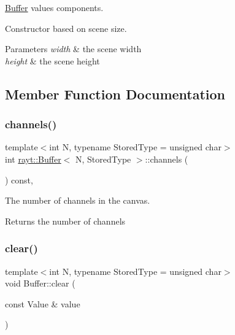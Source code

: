 \mbox{\hyperlink{classrayt_1_1_buffer}{Buffer}} values components. 

Constructor based on scene size.


\begin{DoxyParams}{Parameters}
{\em width} & the scene width \\
\hline
{\em height} & the scene height \\
\hline
\end{DoxyParams}


\subsection{Member Function Documentation}
\mbox{\label{classrayt_1_1_buffer_acb80ea36f8563bfa775eb9a23d316e32}} 
\subsubsection{\texorpdfstring{channels()}{channels()}}
{\footnotesize\ttfamily template$<$int N, typename Stored\+Type = unsigned char$>$ \\
int \mbox{\hyperlink{classrayt_1_1_buffer}{rayt\+::\+Buffer}}$<$ N, Stored\+Type $>$\+::channels (\begin{DoxyParamCaption}{ }\end{DoxyParamCaption}) const\hspace{0.3cm}{\ttfamily [inline]}, {\ttfamily [noexcept]}}



The number of channels in the canvas. 

\begin{DoxyReturn}{Returns}
the number of channels 
\end{DoxyReturn}
\mbox{\label{classrayt_1_1_buffer_a817affcd52f40b49c3f8e3417747de3d}} 
\subsubsection{\texorpdfstring{clear()}{clear()}}
{\footnotesize\ttfamily template$<$int N, typename Stored\+Type = unsigned char$>$ \\
void Buffer\+::clear (\begin{DoxyParamCaption}\item[{const Value \&}]{value }\end{DoxyParamCaption})}



